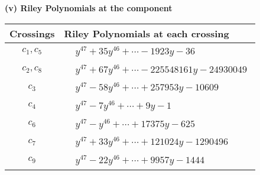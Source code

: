 \documentclass[1p]{elsarticle_modified}
\theoremstyle{definition}
\begin{document}
\newpage\renewcommand{\arraystretch}{1}
\flushleft \textbf{(v) Riley Polynomials at the component}\newline \\
\begin{tabular}{m{50pt}|m{274pt}}
Crossings & \hspace{64pt}Riley Polynomials at each crossing \\
\hline $$\begin{aligned}c_{1},c_{5}\end{aligned}$$&$\begin{aligned}
&y^{47}+35 y^{46}+\cdots-1923 y-36
\end{aligned}$\\
\hline $$\begin{aligned}c_{2},c_{8}\end{aligned}$$&$\begin{aligned}
&y^{47}+67 y^{46}+\cdots-225548161 y-24930049
\end{aligned}$\\
\hline $$\begin{aligned}c_{3}\end{aligned}$$&$\begin{aligned}
&y^{47}-58 y^{46}+\cdots+257953 y-10609
\end{aligned}$\\
\hline $$\begin{aligned}c_{4}\end{aligned}$$&$\begin{aligned}
&y^{47}-7 y^{46}+\cdots+9 y-1
\end{aligned}$\\
\hline $$\begin{aligned}c_{6}\end{aligned}$$&$\begin{aligned}
&y^{47}- y^{46}+\cdots+17375 y-625
\end{aligned}$\\
\hline $$\begin{aligned}c_{7}\end{aligned}$$&$\begin{aligned}
&y^{47}+33 y^{46}+\cdots+121024 y-1290496
\end{aligned}$\\
\hline $$\begin{aligned}c_{9}\end{aligned}$$&$\begin{aligned}
&y^{47}-22 y^{46}+\cdots+9957 y-1444
\end{aligned}$\\

\end{tabular}
\end{document}
